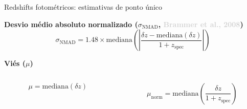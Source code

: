 \begin{frame}[c]{Redshifts fotométricos: estimativas de ponto único}
    \begin{splusbox}{\textbf{Desvio médio absoluto normalizado ($\sigma_\text{NMAD}${, \textcolor{LightGray}{Brammer et al., 2008}})}}
        \begin{equation*}
            \sigma_\text{NMAD} = 1.48 \times \text{mediana} \left( \left| \frac{{\delta z} - \text{mediana}(\delta z)}{1+z_\text{spec}} \right| \right)
        \end{equation*}
    \end{splusbox}


    \begin{splusbox}{\textbf{Viés ($\mu$)}}
        \vspace{-.5cm}
        \begin{columns}[c]
            \begin{column}{0.46\textwidth}
                \centering
                \begin{equation*}
                    \mu = \text{mediana} \left( \delta z \right)
                \end{equation*}
            \end{column}
            \begin{column}{0.46\textwidth}
                \centering
                \begin{equation*}
                    \mu_\text{norm} = \text{mediana} \left( \frac{\delta z}{1+z_{\text{spec}}} \right)
                \end{equation*}
            \end{column}
            \hspace*{1cm}
        \end{columns}
    \end{splusbox}


\end{frame}
